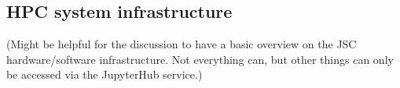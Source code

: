 \subsection{HPC system infrastructure}

(Might be helpful for the discussion to have a basic overview on the JSC hardware/software infrastructure. Not everything can, but other things can only be accessed via the JupyterHub service.)
